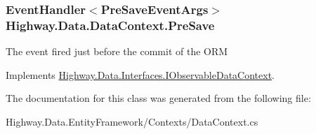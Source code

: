 \hypertarget{class_highway_1_1_data_1_1_data_context_a92833ad619f66fb7245638ff88dedf94}{
\subsubsection[{Pre\-Save}]{\setlength{\rightskip}{0pt plus 5cm}Event\-Handler$<${\bf Pre\-Save\-Event\-Args}$>$ Highway.\-Data.\-Data\-Context.\-Pre\-Save}}\label{class_highway_1_1_data_1_1_data_context_a92833ad619f66fb7245638ff88dedf94}


The event fired just before the commit of the O\-R\-M 



Implements \hyperlink{interface_highway_1_1_data_1_1_interfaces_1_1_i_observable_data_context_add85ecbc05ebf7174003841bdbd72dfe}{Highway.\-Data.\-Interfaces.\-I\-Observable\-Data\-Context}.



The documentation for this class was generated from the following file\-:\begin{DoxyCompactItemize}
\item 
Highway.\-Data.\-Entity\-Framework/\-Contexts/Data\-Context.\-cs\end{DoxyCompactItemize}
